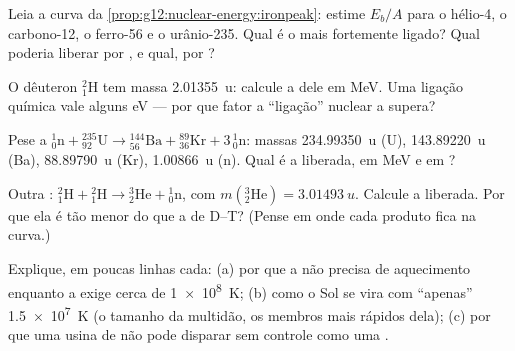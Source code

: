 \begin{exercise}[$\star$]\label{exo:g12:nuclear-energy:5}
Leia a curva da \cref{prop:g12:nuclear-energy:ironpeak}: estime $E_b/A$ para o hélio-4, o
carbono-12, o ferro-56 e o urânio-235. Qual é o mais fortemente ligado? Qual poderia
liberar  por , e qual, por ?
\end{exercise}

\begin{exercise}[$\star\star$]\label{exo:g12:nuclear-energy:6}
O dêuteron ${}^{2}_{1}\mathrm{H}$ tem massa \qty{2.01355}{u}: calcule a  dele em \unit{MeV}. Uma ligação química vale alguns \unit{eV} --- por que fator a
``ligação'' nuclear a supera?
\end{exercise}

\begin{exercise}[$\star\star$]\label{exo:g12:nuclear-energy:7}
Pese a  ${}^{1}_{0}\mathrm{n} + {}^{235}_{92}\mathrm{U} \to
{}^{144}_{56}\mathrm{Ba} + {}^{89}_{36}\mathrm{Kr} + 3\,{}^{1}_{0}\mathrm{n}$: massas
\qty{234.99350}{u} (U), \qty{143.89220}{u} (Ba), \qty{88.89790}{u} (Kr),
\qty{1.00866}{u} (n). Qual é a  liberada, em \unit{MeV} e em ?
\end{exercise}

\begin{exercise}[$\star\star$]\label{exo:g12:nuclear-energy:8}
Outra : ${}^{2}_{1}\mathrm{H} + {}^{2}_{1}\mathrm{H} \to
{}^{3}_{2}\mathrm{He} + {}^{1}_{0}\mathrm{n}$, com
$m({}^{3}_{2}\mathrm{He}) = \qty{3.01493}{u}$. Calcule a  liberada. Por que ela é
tão menor do que a de D--T? (Pense em onde cada produto fica na curva.)
\end{exercise}

\begin{exercise}[$\star\star$]\label{exo:g12:nuclear-energy:9}
Explique, em poucas linhas cada: (a) por que a  não precisa de aquecimento
enquanto a  exige cerca de \qty{1e8}{K}; (b) como o Sol se vira com ``apenas''
\qty{1.5e7}{K} (o tamanho da multidão, os membros mais rápidos dela); (c) por que uma
usina de  não pode disparar sem controle como uma .
\end{exercise}

